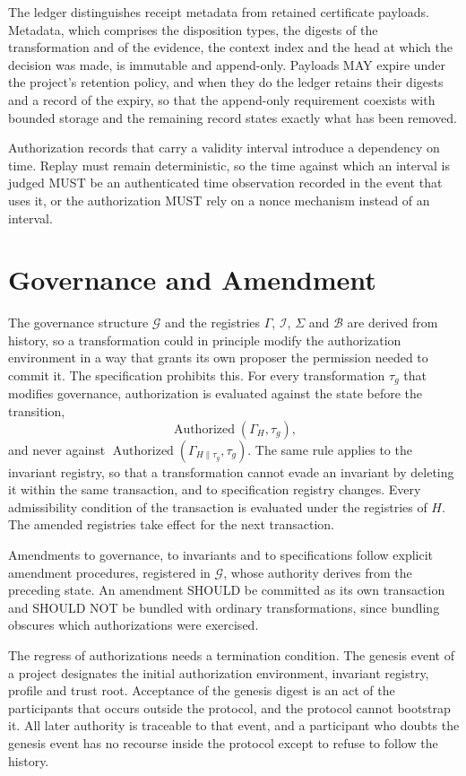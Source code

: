 \documentclass[11pt]{article}
\theoremstyle{remark}
\newcommand{\Auth}{\operatorname{Authorized}}
\newcommand{\concat}{\mathbin{\|}}
\begin{document}
The ledger distinguishes receipt metadata from retained certificate payloads. Metadata, which comprises the disposition types, the digests of the transformation and of the evidence, the context index and the head at which the decision was made, is immutable and append-only. Payloads MAY expire under the project's retention policy, and when they do the ledger retains their digests and a record of the expiry, so that the append-only requirement coexists with bounded storage and the remaining record states exactly what has been removed.

Authorization records that carry a validity interval introduce a dependency on time. Replay must remain deterministic, so the time against which an interval is judged MUST be an authenticated time observation recorded in the event that uses it, or the authorization MUST rely on a nonce mechanism instead of an interval.

\section{Governance and Amendment}\label{sec:gov}

The governance structure $\mathcal G$ and the registries $\Gamma$, $\mathcal I$, $\Sigma$ and $\mathcal B$ are derived from history, so a transformation could in principle modify the authorization environment in a way that grants its own proposer the permission needed to commit it. The specification prohibits this. For every transformation $\tau_g$ that modifies governance, authorization is evaluated against the state before the transition,
\[
\Auth(\Gamma_H,\tau_g),
\]
and never against $\Auth(\Gamma_{H\concat\tau_g},\tau_g)$. The same rule applies to the invariant registry, so that a transformation cannot evade an invariant by deleting it within the same transaction, and to specification registry changes. Every admissibility condition of the transaction is evaluated under the registries of $H$. The amended registries take effect for the next transaction.

Amendments to governance, to invariants and to specifications follow explicit amendment procedures, registered in $\mathcal G$, whose authority derives from the preceding state. An amendment SHOULD be committed as its own transaction and SHOULD NOT be bundled with ordinary transformations, since bundling obscures which authorizations were exercised.

The regress of authorizations needs a termination condition. The genesis event of a project designates the initial authorization environment, invariant registry, profile and trust root. Acceptance of the genesis digest is an act of the participants that occurs outside the protocol, and the protocol cannot bootstrap it. All later authority is traceable to that event, and a participant who doubts the genesis event has no recourse inside the protocol except to refuse to follow the history.
\end{document}
